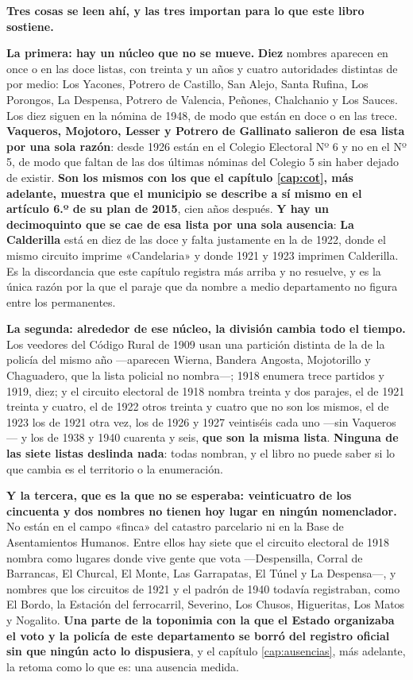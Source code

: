 \begin{cautela}
\textbf{Tres cosas se leen ahí, y las tres importan para lo que este libro sostiene.}

\textbf{La primera: hay un núcleo que no se mueve.} \textbf{Diez} nombres aparecen en once o en
las doce listas, con treinta y un años y cuatro autoridades distintas de por medio:
Los Yacones, Potrero de Castillo, San Alejo,
Santa Rufina, Los Porongos, La Despensa, Potrero de Valencia, Peñones, Chalchanio y Los Sauces.
Los diez siguen en la nómina de 1948, de modo que están en doce o en las trece.
\textbf{Vaqueros, Mojotoro, Lesser y Potrero de Gallinato salieron de esa lista por una sola
razón}: desde 1926 están en el Colegio Electoral Nº 6 y no en el Nº 5, de modo que faltan de las
dos últimas nóminas del Colegio 5 sin haber dejado de existir. \textbf{Son los mismos con los que el capítulo \ref{cap:cot}, más adelante, muestra
que el municipio se describe a sí mismo en el artículo 6.º de su plan de 2015}, cien años después.
\textbf{Y hay un decimoquinto que se cae de esa lista por una sola ausencia}: \textbf{La
Calderilla} está en diez de las doce y falta justamente en la de 1922, donde el mismo circuito
imprime «Candelaria» y donde 1921 y 1923 imprimen Calderilla. Es la discordancia que este capítulo registra más arriba y no resuelve, y
es la única razón por la que el paraje que da nombre a medio departamento no figura entre los
permanentes.

\textbf{La segunda: alrededor de ese núcleo, la división cambia todo el tiempo.} Los veedores del
Código Rural de 1909 usan una partición distinta de la de la policía del mismo año ---aparecen
Wierna, Bandera Angosta, Mojotorillo y Chaguadero, que la lista policial no nombra---; 1918
enumera trece partidos y 1919, diez; y el circuito electoral de 1918 nombra treinta y dos parajes,
el de 1921 treinta y cuatro, el de 1922 otros treinta y cuatro que no son los mismos, el de 1923 los de 1921 otra vez, los de 1926 y 1927 veintiséis cada uno ---sin Vaqueros--- y los de 1938 y 1940 cuarenta y seis, \textbf{que son la misma lista}. \textbf{Ninguna de las siete listas
deslinda nada}: todas
nombran, y el libro no puede saber si lo que cambia es el territorio o la enumeración.

\textbf{Y la tercera, que es la que no se esperaba: veinticuatro de los cincuenta y dos nombres no
tienen hoy lugar en ningún nomenclador.} No están en el campo «finca» del catastro parcelario ni
en la Base de Asentamientos Humanos. Entre ellos hay siete que el circuito electoral de 1918
nombra como lugares donde vive gente que vota ---Despensilla, Corral de Barrancas, El Churcal, El
Monte, Las Garrapatas, El Túnel y La Despensa---, y nombres que los circuitos de 1921 y el padrón de 1940 todavía
registraban, como El Bordo, la Estación del ferrocarril, Severino, Los Chusos, Higueritas, Los
Matos y Nogalito. \textbf{Una parte de la toponimia con la que el Estado organizaba el voto y la
policía de este departamento se borró del registro oficial sin que ningún acto lo dispusiera}, y
el capítulo \ref{cap:ausencias}, más adelante, la retoma como lo que es: una ausencia medida.
\end{cautela}

